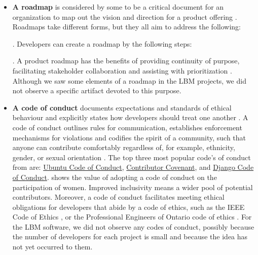 \documentclass[final, 3p, times, authoryear]{elsarticle}
\begin{document}
\begin{itemize}

\item \textbf{A roadmap} is considered by some to be a critical document for an
organization to map out the vision and direction for a product offering
\citep{MunchEtAl2019}.  Roadmaps take different forms, but they all aim to
address the following:  \citep{PhaalEtAl2005}.
Developers can create a roadmap by the following steps:
 \citep{VahaniittyEtAl2002}.  A product
roadmap has the benefits of providing continuity of purpose, facilitating
stakeholder collaboration and assisting with prioritization \citep{Pichler2012}.
Although we saw some elements of a roadmap in the LBM projects, we did not
observe a specific artifact devoted to this purpose.

\item \textbf{A code of conduct} documents expectations and standards of ethical
behaviour and explicitly states how developers should treat one another
\citep{TouraniEtAl2017}. A code of conduct outlines rules for communication,
establishes enforcement mechanisms for violations and codifies the spirit of a
community, such that anyone can contribute comfortably regardless of, for
example, ethnicity, gender, or sexual orientation \citep{TouraniEtAl2017}. The
top three most popular code's of conduct from \citet{TouraniEtAl2017} are:
\href{https://ubuntu.com/community/code-of-conduct} {Ubuntu Code of Conduct},
\href{https://www.contributor-covenant.org/version/2/1/code_of_conduct/}
{Contributor Covenant}, and \href{https://www.djangoproject.com/conduct/}
{Django Code of Conduct}. \citet{SinghEtAl2021} shows the value of adopting a
code of conduct on the participation of women. Improved inclusivity means a
wider pool of potential contributors. Moreover, a code of conduct facilitates
meeting ethical obligations for developers that abide by a code of ethics, such
as the IEEE Code of Ethics \citep{IEEE1999}, or the Professional Engineers of
Ontario code of ethics \citep[p.\ 23--24]{PEO2021}. For the LBM software, we did
not observe any codes of conduct, possibly because the number of developers for
each project is small and because the idea has not yet occurred to them.


\end{itemize}
\end{document}
